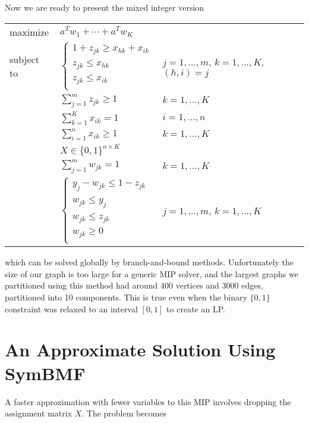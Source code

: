 Now we are ready to present the mixed integer version
\bgroup
\def\arraystretch{1.5}
\begin{tabular}{l l l}
maximize   & $a^T w_1 + \cdots + a^T w_K$ \\
subject to 
           & $\begin{cases}
                 1 + z_{jk} \geq x_{hk} + x_{ik} \\
                 z_{jk} \leq x_{hk}             \\
                 z_{jk} \leq x_{ik}             \\
             \end{cases}$
           & $j = 1, ..., m$, $k = 1, ..., K$, $(h,i) = j$ \\
           & $\sum_{j=1}^m z_{jk} \geq 1$ & $k = 1, ..., K$ \\
           & $\sum_{k=1}^K x_{ik} = 1$ & $i = 1, ..., n$ \\
           & $\sum_{i=1}^n x_{ik} \geq 1$ & $k = 1, ..., K$ \\
           & $X \in \{0, 1\}^{n \times K}$ \\
           & $\sum_{j=1}^m w_{jk} = 1$ & $k = 1, ..., K$ \\
           & $\begin{cases}
                y_j - w_{jk} \leq 1 - z_{jk} \\
                w_{jk} \leq y_j \\
                w_{jk} \leq z_{jk} \\
                w_{jk} \geq 0 \\
             \end{cases}$
           & $j = 1, ..., m$, $k = 1, ..., K$ \\
\end{tabular}
\egroup
which can be solved globally by branch-and-bound methods.
Unfortunately the size of our graph is too large for a generic MIP
solver, and the largest graphs we partitioned using this method had
around 400 vertices and 3000 edges, partitioned into 10 components.
This is true even when the binary $\{0, 1\}$ constraint was relaxed
to an interval $[0, 1]$ to create an LP.


\section{An Approximate Solution Using SymBMF}

A faster approximation with fewer variables to this MIP involves
dropping the assignment matrix $X$. The problem becomes

